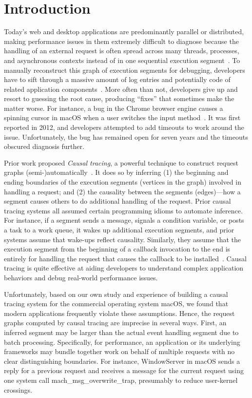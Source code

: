 \section{Introduction} \label{sec:intro}
Today's web and desktop applications are predominantly parallel or distributed,
making performance issues in them extremely difficult to diagnose because the
handling of an external request is often spread across many threads, processes,
and asynchronous contexts instead of in one sequential execution
segment~\cite{harter2012file}.  To manually reconstruct this graph of execution
segments for debugging, developers have to sift through a massive amount of log
entries and potentially code of related application
components~\cite{chen2002pinpoint, zhao2016non, xu2009detecting,
nagaraj2012structured, yuan2012conservative}.  More often than not, developers
give up and resort to guessing the root cause, producing ``fixes'' that
sometimes make the matter worse.  For instance, a bug in the Chrome browser
engine causes a spinning cursor in macOS when a user switches the input
method~\cite{chromiumbugreport}.  It was first reported in 2012, and developers
attempted to add timeouts to work around the issue.  Unfortunately, the bug has
remained open for seven years and the timeouts obscured diagnosis further.

Prior work proposed \emph{Causal tracing}, a powerful technique to construct
request graphs (semi-)automatically~\cite{zhang2013panappticon}. It does so by
inferring (1) the beginning and ending boundaries of the execution segments
(vertices in the graph) involved in handling a request; and (2) the causality
between the segments (edges)---how a segment causes others to do additional
handling of the request.  Prior causal tracing systems all assumed certain
programming idioms to automate inference.  For instance, if a segment sends a
message, signals a condition variable, or posts a task to a work queue, it
wakes up additional execution segments, and prior systems assume that wake-ups
reflect causality.  Similarly, they assume that the execution segment from the
beginning of a callback invocation to the end is entirely for handling the
request that causes the callback to be
installed~\cite{zhang2013panappticon, ravindranath2012appinsight}.
Causal tracing is quite effective at aiding developers to understand complex
application behaviors and debug real-world performance issues.%

Unfortunately, based on our own study and experience of building a causal
tracing system for the commercial operating system macOS, we found that modern
applications frequently violate these assumptions. Hence, the request graphs
computed by causal tracing are imprecise in several ways.  First, an inferred
segment may be larger than the actual event handling segment due to batch
processing.  Specifically, for performance, an application or its underlying
frameworks may bundle together work on behalf of multiple requests with no
clear distinguishing boundaries.  For instance, WindowServer in macOS sends a
reply for a previous request and receives a message for the current request
using one system call mach\_msg\_overwrite\_trap, presumably to reduce
user-kernel crossings.

